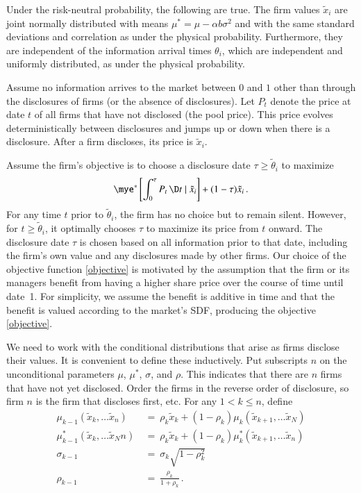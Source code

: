 \documentclass[authoryear,letterpaper,english,12pt]{elsarticle}
\begin{document}
\begin{lemma}\label{lemma:riskneutral}
Under the risk-neutral probability, the following are true.  The firm values $\tilde x_i$ are joint normally distributed with means $\mu^*  = \mu  - \alpha b\sigma^2$ and with the same standard deviations and correlation as under the physical probability.  Furthermore, they are independent of the information arrival times $\theta_i$, which are independent and uniformly distributed, as under the physical probability.
\end{lemma}  

Assume no information arrives to the market between $0$ and $1$ other than through the disclosures of firms (or the absence of disclosures).  Let $P_t$ denote the price at date $t$ of all firms that have not disclosed (the pool price).  This price evolves deterministically between disclosures and jumps up or down when there is a disclosure.  After a firm discloses, its price is $\tilde x_i$.  

Assume the firm's objective is to choose a disclosure date $\tau \ge \tilde \theta_i$ to maximize
\begin{equation}\label{objective}
 \mye^* \left[\int_0^\tau P_t \,\D t \mid \tilde x_i \right]  + (1-\tau)\tilde x_i \,.
\end{equation}
For any time $t$ prior to $\tilde \theta_i$, the firm has no choice but to remain silent. However, for $t \geq \tilde \theta_i$, it optimally chooses $\tau$ to maximize its price from $t$ onward. The disclosure date $\tau$ is chosen based on all information prior to that date, including the firm's own value and any disclosures made by other firms. Our choice of the objective function \eqref{objective} is motivated by the assumption that the firm or its managers benefit from having a higher share price over the course of time until date~1. For simplicity, we assume the benefit is additive in time and that the benefit is valued according to the market's SDF, producing the objective \eqref{objective}.

We need to work with the conditional distributions that arise as firms disclose their values.  It is convenient to define these inductively.  Put subscripts $n$ on the unconditional parameters $\mu$, $\mu^*$, $\sigma$, and $\rho$.  This indicates that there are $n$ firms that have not yet disclosed.  Order the firms in the reverse order of disclosure, so firm $n$ is the firm that discloses first, etc.  For any $1< k \le n$, define
\begin{subequations}\label{parameter_recursion}
\begin{align}
\mu_{k-1}(\tilde x_k, \ldots \tilde x_n) \ & = \ \rho_{k} \tilde x_{k} + (1-\rho_{k})\mu_{k}(\tilde x_{k+1},\ldots \tilde x_{N})\\
\mu^*_{k-1}(\tilde x_k, \ldots \tilde x_Nn) \ & = \ \rho_{k} \tilde x_k + (1-\rho_{k})\mu^*_{k}(\tilde x_{k+1}, \ldots \tilde x_{n})\\
\sigma_{k-1} \ & = \ \sigma_{k}\sqrt{1-\rho_{k}^2}\\
\rho_{k-1} \ & = \ \frac{\rho_{k}}{1+\rho_{k}}\,. \label{rhon}
\end{align}
\end{subequations}
\end{document}
